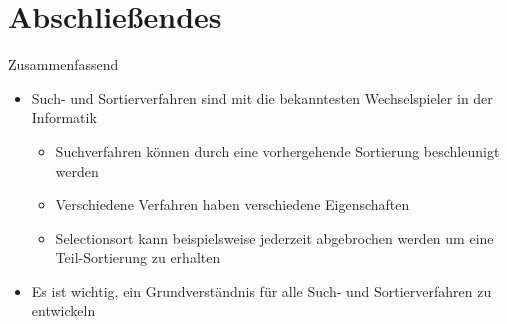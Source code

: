 \section{Abschließendes}
{\SummaryFrame
\begin{frame}[t]{Zusammenfassend}
\pause \printBibCommand
\vfill\vfill %
\begin{itemize}[<+(1)->]
    \itemsep4pt
    \item Such- und Sortierverfahren sind mit die bekanntesten Wechselspieler in der Informatik
    \begin{itemize}
        \item Suchverfahren können durch eine vorhergehende Sortierung beschleunigt werden
        \item Verschiedene Verfahren haben verschiedene Eigenschaften
        \item Selectionsort kann beispielsweise jederzeit abgebrochen werden um eine Teil-Sortierung zu erhalten
    \end{itemize}
    \item Es ist wichtig, ein Grundverständnis für alle Such- und Sortierverfahren zu entwickeln
\end{itemize}
\end{frame}
}


\iffull\fi

